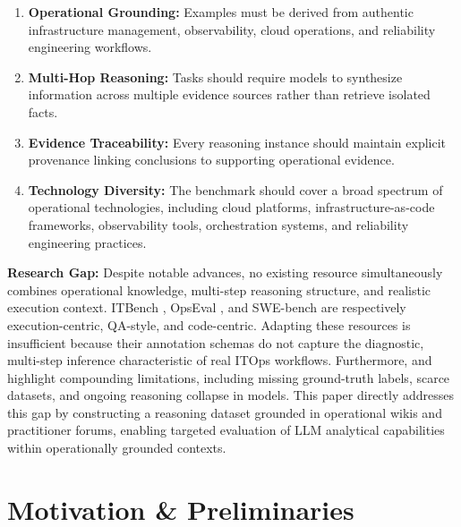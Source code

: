 \documentclass[conference]{IEEEtran}
\begin{document}
\begin{enumerate}
    \item \textbf{Operational Grounding:} Examples must be derived from authentic infrastructure management, observability, cloud operations, and reliability engineering workflows.

    \item \textbf{Multi-Hop Reasoning:} Tasks should require models to synthesize information across multiple evidence sources rather than retrieve isolated facts.
    
    \item \textbf{Evidence Traceability:} Every reasoning instance should maintain explicit provenance linking conclusions to supporting operational evidence.
    
    \item \textbf{Technology Diversity:} The benchmark should cover a broad spectrum of operational technologies, including cloud platforms, infrastructure-as-code frameworks, observability tools, orchestration systems, and reliability engineering practices.
\end{enumerate}


\textbf{Research Gap:} Despite notable advances, no existing resource simultaneously combines operational knowledge, multi-step reasoning structure, and realistic execution context. ITBench \cite{jha2025itbench}, OpsEval \cite{liu2025opseval}, and SWE-bench \cite{jimenez2023swe} are respectively execution-centric, QA-style, and code-centric. Adapting these resources is insufficient because their annotation schemas do not capture the diagnostic, multi-step inference characteristic of real ITOps workflows. Furthermore, \cite{dang2019aiops} and \cite{sacco2025intent} highlight compounding limitations, including missing ground-truth labels, scarce datasets, and ongoing reasoning collapse in models. This paper directly addresses this gap by constructing a reasoning dataset grounded in operational wikis and practitioner forums, enabling targeted evaluation of LLM analytical capabilities within operationally grounded contexts.

\section{Motivation \& Preliminaries}\label{sec3}
\end{document}
